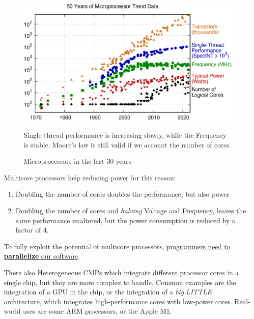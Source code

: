 \begin{figure}[htbp]
   \centering
   \includegraphics{images/01/cores_history.png}
   \caption{Microprocessors in the last 30 years}
   Single thread performance is increasing slowly, while the Frequency is stable.
   Moore's law is still valid if we account the number of cores.
   \label{fig:01/cores_history}
\end{figure}
{Multicore processors help reducing power for this reason:\ns
\begin{enumerate}
   \item Doubling the number of cores doubles the performance, but also power \smiley
   \item Doubling the number of cores and \textit{halving} Voltage and Frequency, leaves the same performance unaltered, but the power consumption is reduced by a factor of 4. \smiley
\end{enumerate}}

To fully exploit the potential of multicore processors, \ul{programmers need to \textbf{parallelize} our software}.

There also Heterogeneous CMPs which integrate different processor cores in a single chip, but they are more complex to handle. Common examples are the integration of a GPU in the chip, or the integration of a \textit{big.LITTLE} architecture, which integrates high-performance cores with low-power cores.
Real-world uses are some ARM processors, or the Apple M1.